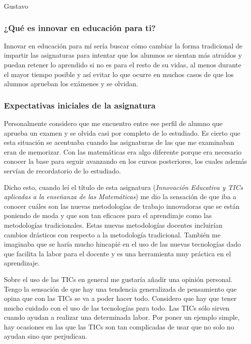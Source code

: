 ﻿
\begin{opin}{\guscolor}{Gustavo}


\subsubsection{¿Qué es innovar en educación para ti?}
Innovar en educación para mí sería buscar cómo cambiar la forma tradicional de impartir las asignaturas para intentar que los alumnos se sientan más atraídos y puedan retener lo aprendido si no es para el resto de su vidas, al menos durante el mayor tiempo posible y así evitar lo que ocurre en muchos casos de que los alumnos aprueban los exámenes y se olvidan.


\subsubsection{Expectativas iniciales de la asignatura}
Personalmente considero que me encuentro entre ese perfil de alumno que aprueba un examen y se olvida casi por completo de  lo estudiado. Es cierto que esta situación se acentuaba cuando las asignaturas de las que me examinaban eran de memorizar. Con las matemáticas era algo diferente porque era necesario conocer la base para seguir avanzando en los cursos posteriores, los cuales además servían de recordatorio de lo estudiado.


Dicho esto, cuando leí el título de esta asignatura (\textit{Innovación Educativa y TICs aplicadas a la enseñanza de las Matemáticas}) me dio la sensación de que iba a conocer cuáles son las nuevas metodologías de trabajo innovadoras que se están poniendo de moda y que son tan eficaces para el aprendizaje como las metodologías tradicionales. Estas nuevas metodologías docentes incluirían cambios drásticos con respecto a la metodología tradicional. También me imaginaba que se haría mucho hincapié en el uso de las nuevas tecnologías dado que facilita la labor para el docente y es una herramienta muy práctica en el aprendizaje.


Sobre el uso de las TICs en general me gustaría añadir una opinión personal. Tengo la sensación de que hay una tendencia generalizada de pensamiento que opina que con las TICs se va a poder hacer todo. Considero que hay que tener mucho cuidado con el uso de las tecnologías para todo. Las TICs sólo sirven cuando ayudan a realizar una determinada labor. Por poner un ejemplo simple, hay ocasiones en las que las TICs son tan complicadas de usar que no solo no ayudan sino que perjudican.

\end{opin}


